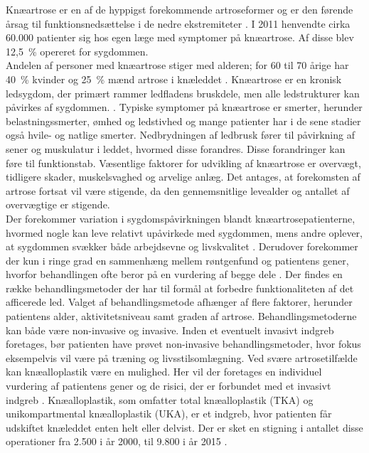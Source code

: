 Knæartrose er en af de hyppigst forekommende artroseformer og er den førende årsag til funktionsnedsættelse i de nedre ekstremiteter \citep{Beswick2012}. I 2011 henvendte cirka 60.000 patienter sig hos egen læge med symptomer på knæartrose. Af disse blev 12,5~\% opereret for sygdommen. \citep{brostrom2012} \\
Andelen af personer med knæartrose stiger med alderen; for 60 til 70 årige har 40~\% kvinder og 25~\% mænd artrose i knæleddet \citep{schroder}. Knæartrose er en kronisk ledsygdom, der primært rammer ledfladens bruskdele, men alle ledstrukturer kan påvirkes af sygdommen. \citep{schroder}. Typiske symptomer på knæartrose er smerter, herunder belastningssmerter, ømhed og ledstivhed og mange patienter har i de sene stadier også hvile- og natlige smerter. Nedbrydningen af ledbrusk fører til påvirkning af sener og muskulatur i leddet, hvormed disse forandres. Disse forandringer kan føre til funktionstab. Væsentlige faktorer for udvikling af knæartrose er overvægt, tidligere skader, muskelsvaghed og arvelige anlæg. Det antages, at forekomsten af artrose fortsat vil være stigende, da den gennemsnitlige levealder og antallet af overvægtige er stigende. \citep{sygdom}\\
Der forekommer variation i sygdomspåvirkningen blandt knæartrosepatienterne, hvormed nogle kan leve relativt upåvirkede med sygdommen, mens andre oplever, at sygdommen svækker både arbejdsevne og livskvalitet \citep{sygdom}. Derudover forekommer der kun i ringe grad en sammenhæng mellem røntgenfund og patientens gener, hvorfor behandlingen ofte beror på en vurdering af begge dele \citep{ugeskrift2011}. Der findes en række behandlingsmetoder der har til formål at forbedre funktionaliteten af det afficerede led. Valget af behandlingsmetode afhænger af flere faktorer, herunder patientens alder, aktivitetsniveau samt graden af artrose. Behandlingsmetoderne kan både være non-invasive og invasive. Inden et eventuelt invasivt indgreb foretages, bør patienten have prøvet non-invasive behandlingsmetoder, hvor fokus eksempelvis vil være på træning og livsstilsomlægning. \citep{schroder}
Ved svære artrosetilfælde kan knæalloplastik være en mulighed. Her vil der foretages en individuel vurdering af patientens gener og de risici, der er forbundet med et invasivt indgreb \citep{schroder}. Knæalloplastik, som omfatter total knæalloplastik (TKA) og unikompartmental knæalloplastik (UKA), er et indgreb, hvor patienten får udskiftet knæleddet enten helt eller delvist. Der er sket en stigning i antallet disse operationer fra 2.500 i år 2000, til 9.800 i år 2015 \citep{aarsrapport2016}.\\
